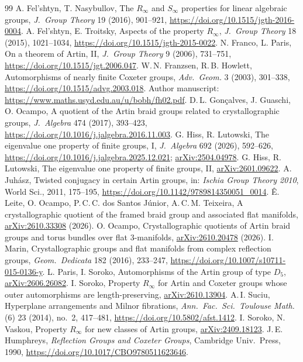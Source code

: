 \documentclass[11pt]{article}
\theoremstyle{definition}
\begin{document}
\begin{thebibliography}{99}
 A. Fel'shtyn, T. Nasybullov, The $R_\infty$ and $S_\infty$ properties for linear algebraic groups, \emph{J.\ Group Theory} 19 (2016), 901--921, \url{https://doi.org/10.1515/jgth-2016-0004}.
 A. Fel'shtyn, E. Troitsky, Aspects of the property $R_\infty$, \emph{J.\ Group Theory} 18 (2015), 1021--1034, \url{https://doi.org/10.1515/jgth-2015-0022}.
 N. Franco, L. Paris, On a theorem of Artin, II, \emph{J.\ Group Theory} 9 (2006), 731--751, \url{https://doi.org/10.1515/jgt.2006.047}.
 W.\,N. Franzsen, R.\,B. Howlett, Automorphisms of nearly finite Coxeter groups, \emph{Adv.\ Geom.} 3 (2003), 301--338, \url{https://doi.org/10.1515/advg.2003.018}. Author manuscript: \url{https://www.maths.usyd.edu.au/u/bobh/fh02.pdf}.
 D.\,L. Gon\c{c}alves, J. Guaschi, O. Ocampo, A quotient of the Artin braid groups related to crystallographic groups, \emph{J.\ Algebra} 474 (2017), 393--423, \url{https://doi.org/10.1016/j.jalgebra.2016.11.003}.
 G. Hiss, R. Lutowski, The eigenvalue one property of finite groups, I, \emph{J.\ Algebra} 692 (2026), 592--626, \url{https://doi.org/10.1016/j.jalgebra.2025.12.021}; \href{https://arxiv.org/abs/2504.04978}{arXiv:2504.04978}.
 G. Hiss, R. Lutowski, The eigenvalue one property of finite groups, II, \href{https://arxiv.org/abs/2601.09622}{arXiv:2601.09622}.
 A. Juh\'asz, Twisted conjugacy in certain Artin groups, in: \emph{Ischia Group Theory 2010}, World Sci., 2011, 175--195, \url{https://doi.org/10.1142/9789814350051_0014}.
 \^E. Leite, O. Ocampo, P.\,C.\,C. dos Santos J\'unior, A.\,C.\,M. Teixeira, A crystallographic quotient of the framed braid group and associated flat manifolds, \href{https://arxiv.org/abs/2610.33308}{arXiv:2610.33308} (2026).
 O. Ocampo, Crystallographic quotients of Artin braid groups and torus bundles over flat $3$-manifolds, \href{https://arxiv.org/abs/2610.20478}{arXiv:2610.20478} (2026).
 I. Marin, Crystallographic groups and flat manifolds from complex reflection groups, \emph{Geom.\ Dedicata} 182 (2016), 233--247, \url{https://doi.org/10.1007/s10711-015-0136-y}.
 L. Paris, I. Soroko, Automorphisms of the Artin group of type $D_5$, \href{https://arxiv.org/abs/2606.26082}{arXiv:2606.26082}.
 I. Soroko, Property $R_\infty$ for Artin and Coxeter groups whose outer automorphisms are length-preserving, \href{https://arxiv.org/abs/2610.13904}{arXiv:2610.13904}.
 A.\,I. Suciu, Hyperplane arrangements and Milnor fibrations, \emph{Ann.\ Fac.\ Sci.\ Toulouse Math.} (6) 23 (2014), no.~2, 417--481, \url{https://doi.org/10.5802/afst.1412}.
 I. Soroko, N. Vaskou, Property $R_\infty$ for new classes of Artin groups, \href{https://arxiv.org/abs/2409.18123}{arXiv:2409.18123}.
 J.\,E. Humphreys, \emph{Reflection Groups and Coxeter Groups}, Cambridge Univ.\ Press, 1990, \url{https://doi.org/10.1017/CBO9780511623646}.
\end{thebibliography}
\end{document}
